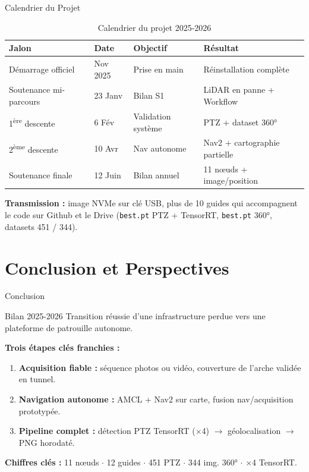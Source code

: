 \documentclass[aspectratio=169]{beamer}
\begin{document}
\begin{frame}{Calendrier du Projet}
    \begin{table}
        \centering
        \begin{tabular}{|l|l|l|l|}
            \hline
            \textbf{Jalon} & \textbf{Date} & \textbf{Objectif} & \textbf{Résultat} \\
            \hline
            Démarrage officiel & Nov 2025 & Prise en main & Réinstallation complète \\
            \hline
            Soutenance mi-parcours & 23 Janv & Bilan S1 & LiDAR en panne + Workflow \\
            \hline
            1\textsuperscript{ère} descente & 6 Fév & Validation système & PTZ + dataset 360° \\
            \hline
            2\textsuperscript{ème} descente & 10 Avr & Nav autonome & Nav2 + cartographie partielle \\
            \hline
            Soutenance finale & 12 Juin & Bilan annuel & 11 nœuds + image/position \\
            \hline
        \end{tabular}
        \caption{Calendrier du projet 2025-2026}
    \end{table}
    \vspace{0.3cm}
    \centering
    \textbf{Transmission :} image NVMe sur clé USB, plus de 10 guides qui accompagnent le code sur Github et le Drive (\texttt{best.pt} PTZ + TensorRT, \texttt{best.pt} 360°, datasets 451 / 344).
\end{frame}

\section{Conclusion et Perspectives}

\begin{frame}{Conclusion}
    \begin{block}{Bilan 2025-2026}
        Transition réussie d'une infrastructure perdue vers une plateforme de patrouille autonome.
    \end{block}
    \vspace{0.4cm}
    \textbf{Trois étapes clés franchies :}
    \begin{enumerate}
        \item \textbf{Acquisition fiable :} séquence photos ou vidéo, couverture de l'arche validée en tunnel.
        \item \textbf{Navigation autonome :} AMCL + Nav2 sur carte, fusion nav/acquisition prototypée.
        \item \textbf{Pipeline complet :} détection PTZ TensorRT ($\times$4) $\rightarrow$ géolocalisation $\rightarrow$ PNG horodaté.
    \end{enumerate}
    \vspace{0.4cm}
    \centering
    \textbf{Chiffres clés :} 11 nœuds $\cdot$ 12 guides $\cdot$ 451 PTZ $\cdot$ 344 img. 360° $\cdot$ $\times$4 TensorRT.
\end{frame}
\end{document}
